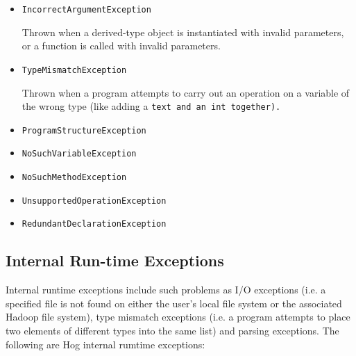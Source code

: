 \documentclass{article}
\begin{document}
\begin{itemize}
  \item[] \tt IncorrectArgumentException \rm
  
  Thrown when a derived-type object is instantiated with invalid parameters, or a function is called with invalid parameters.
  
  \item[] \tt TypeMismatchException \rm
  
  Thrown when a program attempts to carry out an operation on a variable of the wrong type (like adding a \tt text \rm and an
  \tt int \rm together).
  \item[] \tt ProgramStructureException \rm
  \item[] \tt NoSuchVariableException \rm
  \item[] \tt NoSuchMethodException \rm
  \item[] \tt UnsupportedOperationException \rm
  \item[] \tt RedundantDeclarationException \rm
\end{itemize}


\subsection{Internal Run-time Exceptions} %
\label{sub:internal_run_time_exceptions}

Internal run­time exceptions include such problems as I/O exceptions (i.e. a specified file is not found on either the user’s
local file system or the associated Hadoop file system), type mismatch exceptions (i.e. a program attempts to place two
elements of different types into the same list) and parsing exceptions. The following are Hog internal rum­time exceptions:
\end{document}
